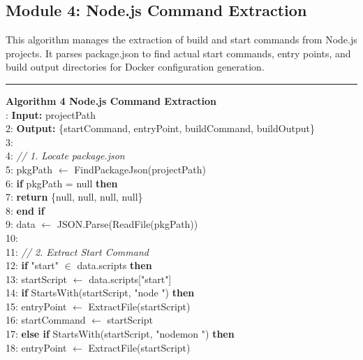 \subsection{Module 4: Node.js Command Extraction}

This algorithm manages the extraction of build and start commands from Node.js projects. It parses package.json to find actual start commands, entry points, and build output directories for Docker configuration generation.

\noindent\rule{\textwidth}{0.4pt}
\textbf{Algorithm 4 Node.js Command Extraction}\\
: \textbf{Input:} projectPath\\
2: \textbf{Output:} \{startCommand, entryPoint, buildCommand, buildOutput\}\\
3:\\
4: \textit{// 1. Locate package.json}\\
5: pkgPath $\leftarrow$ FindPackageJson(projectPath)\\
6: \textbf{if} pkgPath = null \textbf{then}\\
7: \hspace{0.5cm}\textbf{return} \{null, null, null, null\}\\
8: \textbf{end if}\\
9: data $\leftarrow$ JSON.Parse(ReadFile(pkgPath))\\
10:\\
11: \textit{// 2. Extract Start Command}\\
12: \textbf{if} "start" $\in$ data.scripts \textbf{then}\\
13: \hspace{0.5cm}startScript $\leftarrow$ data.scripts["start"]\\
14: \hspace{0.5cm}\textbf{if} StartsWith(startScript, "node ") \textbf{then}\\
15: \hspace{1cm}entryPoint $\leftarrow$ ExtractFile(startScript)\\
16: \hspace{1cm}startCommand $\leftarrow$ startScript\\
17: \hspace{0.5cm}\textbf{else if} StartsWith(startScript, "nodemon ") \textbf{then}\\
18: \hspace{1cm}entryPoint $\leftarrow$ ExtractFile(startScript)\\
